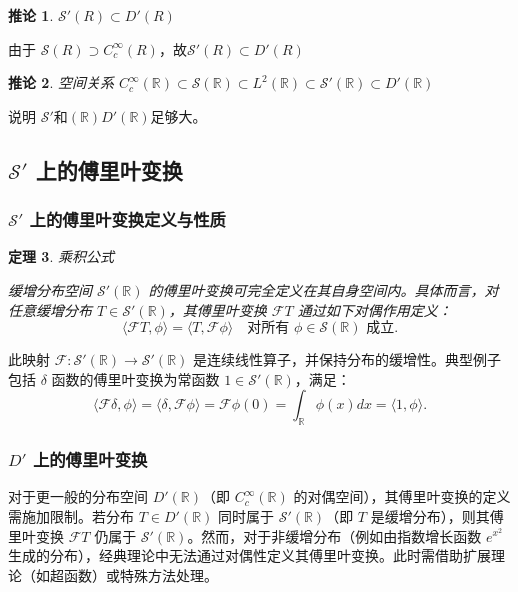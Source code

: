 \documentclass[12pt,a4paper]{article}
\newcommand{\diff}{\mathop{}\!\mathrm{d}}  %
\newcommand{\R}{\mathbb{R}}                %
\def\R{R}%
\def\diff{d}%
\theoremstyle{plain}
\newtheorem{theorem}{定理}[section]
\newtheorem{corollary}[theorem]{推论}  %
\theoremstyle{definition}
\theoremstyle{remark}
\begin{document}
\begin{corollary}
	$\mathcal{S}'(\R) \subset D'(\R)$
\end{corollary}

由于 $\mathcal{S}(\R) \supset C_c^\infty(\R)$，故$\mathcal{S}'(\R) \subset D'(\R)$

\begin{corollary}空间关系
$C_c^\infty(\mathbb{R}) \subset \mathcal{S}(\mathbb{R}) \subset L^2(\mathbb{R}) \subset \mathcal{S}'(\mathbb{R}) \subset D'(\mathbb{R})$	
\end{corollary}
说明 $\mathcal{S}'$和$(\mathbb{R})D'(\mathbb{R})$足够大。


\subsection{$\mathcal{S}'$  上的傅里叶变换}

\subsubsection{$\mathcal{S}'$  上的傅里叶变换定义与性质}

\begin{theorem}乘积公式
	
	缓增分布空间 $\mathcal{S}'(\mathbb{R})$ 的傅里叶变换可完全定义在其自身空间内。具体而言，对任意缓增分布 $T \in \mathcal{S}'(\mathbb{R})$，其傅里叶变换 $\mathcal{F}T$ 通过如下对偶作用定义：
	\[
	\langle \mathcal{F}T, \phi \rangle = \langle T, \mathcal{F}\phi \rangle \quad \text{对所有 } \phi \in \mathcal{S}(\mathbb{R}) \text{ 成立}.
	\]
\end{theorem}	
	
	
	此映射 $\mathcal{F}: \mathcal{S}'(\mathbb{R}) \to \mathcal{S}'(\mathbb{R})$ 是连续线性算子，并保持分布的缓增性。典型例子包括  $\delta$ 函数的傅里叶变换为常函数 $1 \in \mathcal{S}'(\mathbb{R})$，满足：
	\[
	\langle \mathcal{F}\delta, \phi \rangle = \langle \delta, \mathcal{F}\phi \rangle = \mathcal{F}\phi(0) = \int_{\mathbb{R}} \phi(x) \diff x = \langle 1, \phi \rangle.
	\]


\subsubsection{ $D'$ 上的傅里叶变换}

	对于更一般的分布空间 $D'(\mathbb{R})$（即 $C_c^\infty(\mathbb{R})$ 的对偶空间），其傅里叶变换的定义需施加限制。若分布 $T \in D'(\mathbb{R})$ 同时属于 $\mathcal{S}'(\mathbb{R})$（即 $T$ 是缓增分布），则其傅里叶变换 $\mathcal{F}T$ 仍属于 $\mathcal{S}'(\mathbb{R})$。然而，对于非缓增分布（例如由指数增长函数 $e^{x^2}$ 生成的分布），经典理论中无法通过对偶性定义其傅里叶变换。此时需借助扩展理论（如超函数）或特殊方法处理。
\end{document}

